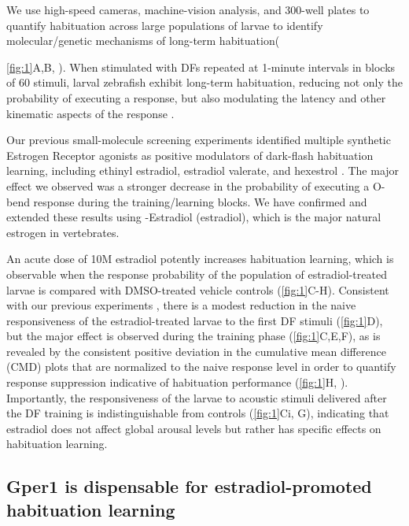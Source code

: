 \documentclass[9pt,lineno]{RandlettLab_elife}
\begin{document}
We use high-speed cameras, machine-vision analysis, and 300-well plates to quantify habituation across large populations of larvae to identify molecular/genetic mechanisms of long-term habituation({\autoref{fig:1}A,B, \citealp{Randlett2019-fj,Lamire2023-he}). 
When stimulated with DFs repeated at 1-minute intervals in blocks of 60 stimuli, larval zebrafish exhibit long-term habituation, reducing not only the probability of executing a response, but also modulating the latency and other kinematic aspects of the response \citep{Randlett2019-fj}.  


Our previous small-molecule screening experiments identified multiple synthetic Estrogen Receptor agonists as positive modulators of dark-flash habituation learning, including ethinyl estradiol, estradiol valerate, and hexestrol  \citep{Lamire2023-he}. 
The major effect we observed was a stronger decrease in the probability of executing a O-bend response during the training/learning blocks. 
We have confirmed and extended these results using \textbeta-Estradiol (estradiol), which is the major natural estrogen in vertebrates. 

An acute dose of 10\textmu M estradiol potently increases habituation learning, which is observable when the response probability of the population of estradiol-treated larvae is compared with DMSO-treated vehicle controls (\autoref{fig:1}C-H).
Consistent with our previous experiments \citep{Lamire2023-he}, there is a modest reduction in the naive responsiveness of the estradiol-treated larvae to the first DF stimuli (\autoref{fig:1}D), but the major effect is observed during the training phase (\autoref{fig:1}C,E,F), as is revealed by the consistent positive deviation in the cumulative mean difference (CMD) plots that are normalized to the naive response level in order to quantify response suppression indicative of habituation performance (\autoref{fig:1}H, \citealp{Randlett2019-fj}).
Importantly, the responsiveness of the larvae to acoustic stimuli delivered after the DF training is indistinguishable from controls (\autoref{fig:1}Ci, G), indicating that estradiol does not affect global arousal levels but rather has specific effects on habituation learning. 

\subsection{Gper1 is dispensable for estradiol-promoted habituation learning}

}
\end{document}
